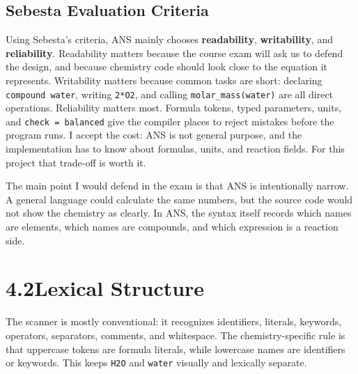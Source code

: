 \documentclass[11pt,a4paper]{article}
\newcommand{\code}[1]{\texttt{#1}}
\begin{document}
\subsection{Sebesta Evaluation Criteria}

Using Sebesta's criteria, ANS mainly chooses \textbf{readability}, \textbf{writability}, and
\textbf{reliability}. Readability matters because the course exam will ask us to defend the design,
and because chemistry code should look close to the equation it represents. Writability matters
because common tasks are short: declaring \code{compound water}, writing \code{2*O2}, and calling
\code{molar\_mass(water)} are all direct operations. Reliability matters most. Formula tokens,
typed parameters, units, and \code{check = balanced} give the compiler places to reject mistakes
before the program runs. I accept the cost: ANS is not general purpose, and the implementation
has to know about formulas, units, and reaction fields. For this project that trade-off is worth it.

The main point I would defend in the exam is that ANS is intentionally narrow. A general
language could calculate the same numbers, but the source code would not show the chemistry
as clearly. In ANS, the syntax itself records which names are elements, which names are
compounds, and which expression is a reaction side.

\section{4.2\quad Lexical Structure}

The scanner is mostly conventional: it recognizes identifiers, literals, keywords, operators,
separators, comments, and whitespace. The chemistry-specific rule is that uppercase tokens are
formula literals, while lowercase names are identifiers or keywords. This keeps \code{H2O} and
\code{water} visually and lexically separate.
\end{document}
